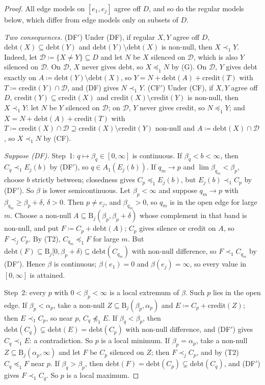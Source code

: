 \documentclass[11pt]{article}
\theoremstyle{definition}\newtheorem{definition}[theorem]{Definition}
\theoremstyle{remark}\newtheorem{remark}[theorem]{Remark}
\newcommand{\debt}{\mathrm{debt}}
\newcommand{\cred}{\mathrm{credit}}
\newcommand{\Band}{\mathrm{B}}
\begin{document}
\begin{proof}
All edge models on $[e_1,e_j]$ agree off $D$, and so do the regular models
below, which differ from edge models only on subsets of $D$.

\emph{Two consequences.} (DF$'$) Under (DF), if regular $X,Y$ agree off $D$,
$\debt(X)\subseteq\debt(Y)$ and $\debt(Y)\setminus\debt(X)$ is non-null, then
$X\prec_1Y$. Indeed, let $\mathcal D\coloneqq\{X\ne Y\}\subseteq D$ and let
$N$ be $X$ silenced on $\mathcal D$, which is also $Y$ silenced on
$\mathcal D$. On $\mathcal D$, $X$ never gives debt, so $X\preceq_1N$ by (G).
On $\mathcal D$, $Y$ gives debt exactly on $A\coloneqq\debt(Y)\setminus
\debt(X)$, so $Y=N+\debt(A)+\cred(T)$ with $T\coloneqq\cred(Y)\cap\mathcal D$,
and (DF) gives $N\prec_1Y$. (CF$'$) Under (CF), if $X,Y$ agree off $D$,
$\cred(Y)\subseteq\cred(X)$ and $\cred(X)\setminus\cred(Y)$ is non-null, then
$X\prec_1Y$: let $N$ be $Y$ silenced on $\mathcal D$; on $\mathcal D$, $Y$
never gives credit, so $N\preceq_1Y$; and $X=N+\debt(A)+\cred(T)$ with
$T\coloneqq\cred(X)\cap\mathcal D\supseteq\cred(X)\setminus\cred(Y)$ non-null
and $A\coloneqq\debt(X)\cap\mathcal D$, so $X\prec_1N$ by (CF).

\emph{Suppose (DF).} Step~1: $q\mapsto\beta_q\in[0,\infty]$ is continuous.
If $\beta_q<b<\infty$, then $C_q\prec_1E_j(b)$ by (DF$'$), so
$q\in A_1(E_j(b))$. If $q_m\to p$ and $\lim\beta_{q_m}<\beta_p$, choose $b$
strictly between; closedness gives $C_p\preceq_1E_j(b)$, but
$E_j(b)\prec_1C_p$ by (DF$'$). So $\beta$ is lower semicontinuous. Let
$\beta_p<\infty$ and suppose $q_m\to p$ with $\beta_{q_m}\ge\beta_p+\delta$,
$\delta>0$. Then $p\ne e_j$, and $\beta_{q_m}>0$, so $q_m$ is in the open
edge for large $m$.
Choose a non-null $A\subseteq\Band_j(\beta_p,\beta_p+\delta)$ whose
complement in that band is non-null, and put $F\coloneqq C_p+\debt(A)$;
$C_p$ gives silence or credit on $A$, so $F\prec_jC_p$. By (T2),
$C_{q_m}\preceq_1F$ for large $m$. But $\debt(F)\subseteq
\Band_j[0,\beta_p+\delta)\subseteq\debt(C_{q_m})$ with non-null difference,
so $F\prec_1C_{q_m}$ by (DF$'$). Hence $\beta$ is continuous;
$\beta(e_1)=0$ and $\beta(e_j)=\infty$, so every value in $[0,\infty]$ is
attained.

Step~2: every $p$ with $0<\beta_p<\infty$ is a local extremum of $\beta$.
Such $p$ lies in the open edge. If $\beta_p<\alpha_p$, take a non-null
$Z\subseteq\Band_j(\beta_p,\alpha_p)$ and $E\coloneqq C_p+\cred(Z)$; then
$E\prec_1C_p$, so near $p$, $C_q\not\preceq_1E$. If $\beta_q<\beta_p$, then
$\debt(C_q)\subsetneq\debt(E)=\debt(C_p)$ with non-null difference, and
(DF$'$) gives $C_q\prec_1E$: a contradiction. So $p$ is a local minimum. If
$\beta_p=\alpha_p$, take a non-null $Z\subseteq\Band_j(\alpha_p,\infty)$ and
let $F$ be $C_p$ silenced on $Z$; then $F\prec_jC_p$, and by (T2)
$C_q\preceq_1F$ near $p$. If $\beta_q>\beta_p$, then
$\debt(F)=\debt(C_p)\subsetneq\debt(C_q)$, and (DF$'$) gives $F\prec_1C_q$.
So $p$ is a local maximum.


\end{proof}
\end{document}
